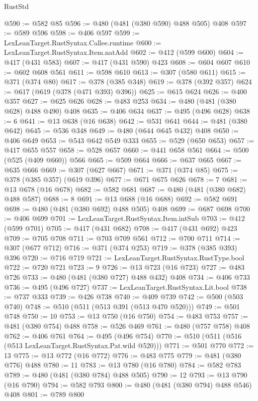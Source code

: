 \begin{lexlean}{RustStd}
\begin{coremodule}
@590 := @582 @85
@596 := @480 (@481 (@380 @590) @488 @505) @408
@597 := @589 @596
@598 := @406 @597
@599 := LexLeanTarget.RustSyntax.Callee.runtime
@600 := LexLeanTarget.RustSyntax.Item.natAdd
@602 := @412 (@599 @600)
@604 := @417 (@431 @583)
@607 := @417 (@431 @590) @423
@608 := @604 @607
@610 := @602 @608 @561
@611 := @598 @610
@613 := @307 (@580 @611)
@615 := @371 (@374 @80)
@617 := @378 (@385 @348)
@619 := @378 (@392 @357)
@624 := @617 (@619 (@378 (@471 @393) @396))
@625 := @615 @624
@626 := @400 @357
@627 := @625 @626
@628 := @483 @253
@634 := @480 (@481 (@380 @628) @488 @490) @408
@635 := @406 @634
@637 := @495 (@496 @628)
@638 := 6
@641 := @13 @638 (@16 @638)
@642 := @531 @641
@644 := @481 (@380 @642)
@645 := @536 @348
@649 := @480 (@644 @645 @432) @408
@650 := @406 @649
@653 := @543 @642 @549 @333
@655 := @529 (@650 @653)
@657 := @417 @655 @557
@658 := @528 @657
@660 := @441 @658 @561
@664 := @500 (@525 (@409 @660)) @566
@665 := @509 @664
@666 := @637 @665
@667 := @635 @666
@669 := @307 (@627 @667)
@671 := @371 (@374 @85)
@675 := @378 (@385 @357) (@619 @396)
@677 := @671 @675 @626
@678 := 7
@681 := @13 @678 (@16 @678)
@682 := @582 @681
@687 := @480 (@481 (@380 @682) @488 @587)
@688 := 8
@691 := @13 @688 (@16 @688)
@692 := @582 @691
@698 := @480 (@481 (@380 @692) @488 @505) @408
@699 := @687 @698
@700 := @406 @699
@701 := LexLeanTarget.RustSyntax.Item.intSub
@703 := @412 (@599 @701)
@705 := @417 (@431 @682)
@708 := @417 (@431 @692) @423
@709 := @705 @708
@711 := @703 @709 @561
@712 := @700 @711
@714 := @307 (@677 @712)
@716 := @371 (@374 @253)
@719 := @378 (@385 @393) @396
@720 := @716 @719
@721 := LexLeanTarget.RustSyntax.RustType.bool
@722 := @720 @721
@723 := 9
@726 := @13 @723 (@16 @723)
@727 := @483 @726
@733 := @480 (@481 (@380 @727) @488 @432) @408
@734 := @406 @733
@736 := @495 (@496 @727)
@737 := LexLeanTarget.RustSyntax.Lit.bool
@738 := @737 @333
@739 := @426 @738
@740 := @409 @739
@742 := @500 (@503 @740)
@748 := @510 (@511 (@513 @391 (@513 @470 @520)))
@749 := @501 @748
@750 := 10
@753 := @13 @750 (@16 @750)
@754 := @483 @753
@757 := @481 (@380 @754) @488
@758 := @526 @469
@761 := @480 (@757 @758) @408
@762 := @406 @761
@764 := @495 (@496 @754)
@770 := @510 (@511 (@516 (@513 LexLeanTarget.RustSyntax.Pat.wild @520)))
@771 := @501 @770
@772 := 13
@775 := @13 @772 (@16 @772)
@776 := @483 @775
@779 := @481 (@380 @776) @488
@780 := 11
@783 := @13 @780 (@16 @780)
@784 := @582 @783
@789 := @480 (@481 (@380 @784) @488 @505)
@790 := 12
@793 := @13 @790 (@16 @790)
@794 := @582 @793
@800 := @480 (@481 (@380 @794) @488 @546) @408
@801 := @789 @800

\end{coremodule}
\end{lexlean}
